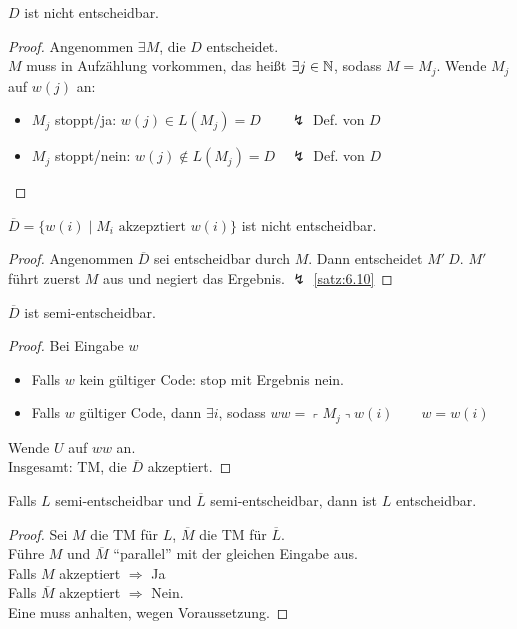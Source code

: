 \begin{Satz}[name={[$D$ ist nicht entscheidbar]}]\label{satz:6.10}
	$D$ ist nicht entscheidbar.
\end{Satz}
\begin{proof}
	Angenommen $\exists M$, die $D$ entscheidet.\\
	$M$ muss in Aufzählung vorkommen, das heißt $\exists j\in \mathbb{N}$, sodass $M = M_j$.
	Wende $M_j$ auf $w(j)$ an:
	\begin{itemize}
		\item $M_j$ stoppt/ja: $w(j) \in L(M_j) = D \qquad \lightning$ Def. von $D$
		\item $M_j$ stoppt/nein: $w(j) \notin L(M_j) = D \quad \lightning$ Def. von $D$ \qedhere
	\end{itemize}
\end{proof}
\begin{Korollar}\label{kor:6.11}
	$\overline{D} = \{w(i) \mid M_i\text{ akzepztiert }w(i) \}$ ist nicht entscheidbar.
\end{Korollar}
\begin{proof}
	Angenommen $\overline{D}$ sei entscheidbar durch $M$. Dann entscheidet $M'\ D$. $M'$ führt 
	zuerst $M$ aus und negiert das Ergebnis. $\lightning$ \autoref{satz:6.10}
\end{proof}
\begin{lemma}[name={[$\overline{D}$ ist semi-entscheidbar]}]
	$\overline{D}$ ist semi-entscheidbar.
\end{lemma}
\begin{proof}
	Bei Eingabe $w$
	\begin{itemize}
		\item Falls $w$ kein gültiger Code: stop mit Ergebnis nein.
		\item Falls $w$ gültiger Code, dann $\exists i$, sodass $ww = \left\ulcorner M_j
		\right\urcorner w(i) \qquad w = w(i)$
	\end{itemize}
	Wende $U$ auf $ww$ an.\\
	Insgesamt: \ac{TM}, die $\overline{D}$ akzeptiert.
\end{proof}
\begin{Satz}[name={[{$L,\overline{L}$ semi-entscheidbar $\=> L$ entscheidbar}]},restate={[name=Wiederholung]repeatSatz613}]\label{satz:6.13}
	Falls $L$ semi-entscheidbar und $\overline{L}$ semi-entscheidbar, dann ist $L$ entscheidbar.
\end{Satz}
\begin{proof}
	Sei $M$ die \ac{TM} für $L$, $\overline{M}$ die \ac{TM} für $\overline{L}$.\\
	Führe $M$ und $\overline{M}$ "`parallel"' mit der gleichen Eingabe aus.\\
	Falls $M$ akzeptiert $\Rightarrow$ Ja\\
	Falls $\overline{M}$ akzeptiert $\Rightarrow$ Nein.\\
	Eine muss anhalten, wegen Voraussetzung.
\end{proof}
